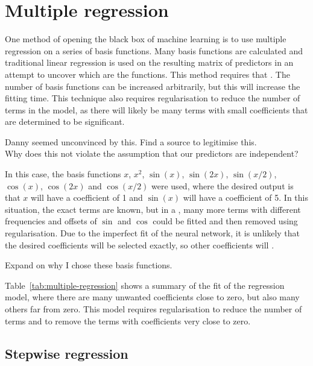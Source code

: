 \section{Multiple regression}

One method of opening the black box of machine learning is to use multiple regression on a series of basis functions.
Many basis functions are calculated and traditional linear regression is used on the resulting matrix of predictors in an attempt to uncover which are the  functions.
This method requires that .
The number of basis functions can be increased arbitrarily, but this will increase the fitting time.
This technique also requires regularisation to reduce the number of terms in the model, as there will likely be many terms with small coefficients that are determined to be significant.

\begin{todo}
	Danny seemed unconvinced by this. Find a source to legitimise this. \\
	Why does this not violate the assumption that our predictors are independent?
\end{todo}

In this case, the basis functions \(x\), \(x^2\), \(\sin(x)\), \(\sin(2x)\), \(\sin(x/2)\), \(\cos(x)\), \(\cos(2x)\) and \(\cos(x/2)\) were used, where the desired output is that \(x\) will have a coefficient of 1 and \(\sin(x)\) will have a coefficient of 5.
In this situation, the exact  terms are known, but in a , many more terms with different frequencies and offsets of \(\sin\) and \(\cos\) could be fitted and then removed using regularisation.
Due to the imperfect fit of the neural network, it is unlikely that the desired coefficients will be selected exactly, so other coefficients will .

\begin{todo}
	Expand on why I chose these basis functions.
\end{todo}

Table~\ref{tab:multiple-regression} shows a summary of the fit of the regression model, where there are many unwanted coefficients close to zero, but also many others far from zero.
This model requires regularisation to reduce the number of terms and to remove the terms with coefficients very close to zero.

\subsection{Stepwise regression}

